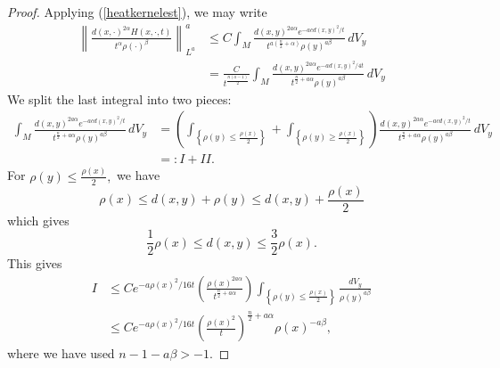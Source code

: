 \documentclass[10pt,a4paper]{amsart}
\begin{document}
\begin{proof}
    Applying (\ref{heatkernelest}), we may write
    \begin{equation}\label{Laest}
    \begin{split}
        \left\|  \frac{d(x,\cdot)^{2\alpha} H(x,\cdot, t) }{t^\alpha \rho(\cdot)^\beta} \right\|_{L^{a}}^a & \leq C \int_M \frac{d(x,y)^{2a\alpha} e^{-a c d(x,y)^2/t} }{t^{a \left( \frac{n}{2} + \alpha \right)} \rho(y)^{a\beta} } \, dV_y \\
        & = \frac{C}{t^{\frac{n(a - 1)}{2}}} \int_M \frac{d(x,y)^{2a\alpha} e^{-a d(x,y)^2/4t} }{t^{\frac{n}{2} + a\alpha } \rho(y)^{a\beta} } \, dV_y
        \end{split}
        \end{equation}
    We split the last integral into two pieces: %
    \begin{equation}\label{I-IIdefinition}
    \begin{split}
    \int_M \frac{d(x,y)^{2a\alpha} e^{-a cd(x,y)^2/t} }{t^{\frac{n}{2} + a\alpha } \rho(y)^{a\beta} } \, dV_y & = \left( \int_{\left\{ \rho(y) \leq \frac{\rho(x)}{2} \right\} } + \int_{\left\{ \rho(y) \geq \frac{\rho(x)}{2} \right\} } \right)  \frac{d(x,y)^{2a\alpha} e^{-a cd(x,y)^2/t} }{t^{\frac{n}{2} + a\alpha } \rho(y)^{a\beta} } \, dV_y \\
    & =: I + II.
    \end{split}
    \end{equation}
    For $\rho(y) \leq \frac{\rho(x)}{2},$ we have
    $$\rho(x) \leq d(x,y) + \rho(y) \leq d(x,y) + \frac{\rho(x)}{2}$$
    which gives
    $$\frac12 \rho(x) \leq d(x,y) \leq \frac32 \rho(x).$$
    This gives
    \begin{equation}\label{Ifinalest}
    \begin{split}
    I & \leq C e^{-a \rho(x)^2/16t} \left( \frac{\rho(x)^{2a\alpha}}{t^{\frac{n}{2} + a\alpha}} \right) \int_{\left\{ \rho(y) \leq \frac{\rho(x)}{2} \right\} } \frac{dV_y}{\rho(y)^{a\beta}} \\
    & \leq C e^{-a \rho(x)^2/16t} \left( \frac{\rho(x)^2}{t} \right)^{\frac{n}{2} + a\alpha}  \rho(x)^{- a\beta},
    \end{split}
    \end{equation}
    where we have used $n -1 - a\beta > -1.$ %
    

\end{proof}
\end{document}
